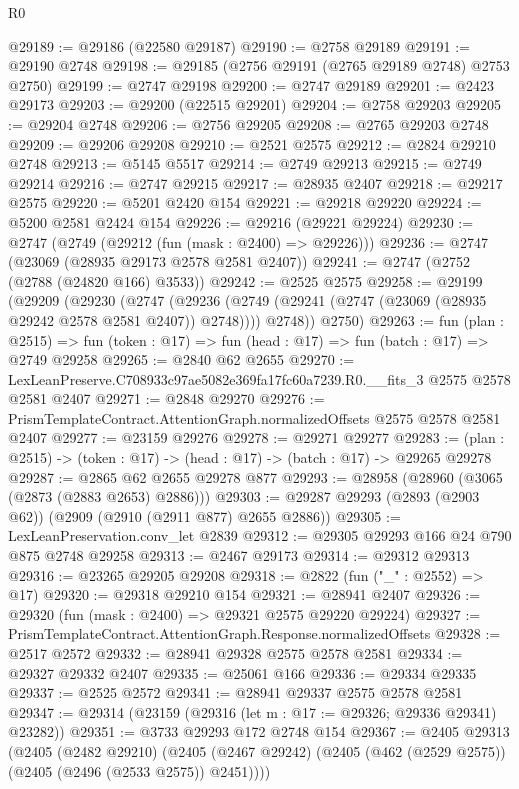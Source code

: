 \begin{lexlean}{R0}
\begin{coremodule}
@29189 := @29186 (@22580 @29187)
@29190 := @2758 @29189
@29191 := @29190 @2748
@29198 := @29185 (@2756 @29191 (@2765 @29189 @2748) @2753 @2750)
@29199 := @2747 @29198
@29200 := @2747 @29189
@29201 := @2423 @29173
@29203 := @29200 (@22515 @29201)
@29204 := @2758 @29203
@29205 := @29204 @2748
@29206 := @2756 @29205
@29208 := @2765 @29203 @2748
@29209 := @29206 @29208
@29210 := @2521 @2575
@29212 := @2824 @29210 @2748
@29213 := @5145 @5517
@29214 := @2749 @29213
@29215 := @2749 @29214
@29216 := @2747 @29215
@29217 := @28935 @2407
@29218 := @29217 @2575
@29220 := @5201 @2420 @154
@29221 := @29218 @29220
@29224 := @5200 @2581 @2424 @154
@29226 := @29216 (@29221 @29224)
@29230 := @2747 (@2749 (@29212 (fun (mask : @2400) => @29226)))
@29236 := @2747 (@23069 (@28935 @29173 @2578 @2581 @2407))
@29241 := @2747 (@2752 (@2788 (@24820 @166) @3533))
@29242 := @2525 @2575
@29258 := @29199
    (@29209
      (@29230
        (@2747
          (@29236 (@2749 (@29241 (@2747 (@23069 (@28935 @29242 @2578 @2581 @2407)) @2748))))
          @2748))
      @2750)
@29263 := fun (plan : @2515) =>
  fun (token : @17) => fun (head : @17) => fun (batch : @17) => @2749 @29258
@29265 := @2840 @62 @2655
@29270 := LexLeanPreserve.C708933c97ae5082e369fa17fc60a7239.R0.__fits_3 @2575 @2578 @2581 @2407
@29271 := @2848 @29270
@29276 := PrismTemplateContract.AttentionGraph.normalizedOffsets @2575 @2578 @2581 @2407
@29277 := @23159 @29276
@29278 := @29271 @29277
@29283 := (plan : @2515) -> (token : @17) -> (head : @17) -> (batch : @17) -> @29265 @29278
@29287 := @2865 @62 @2655 @29278 @877
@29293 := @28958 (@28960 (@3065 (@2873 (@2883 @2653) @2886)))
@29303 := @29287 @29293 (@2893 (@2903 @62)) (@2909 (@2910 (@2911 @877) @2655 @2886))
@29305 := LexLeanPreservation.conv_let @2839
@29312 := @29305 @29293 @166 @24 @790 @875 @2748 @29258
@29313 := @2467 @29173
@29314 := @29312 @29313
@29316 := @23265 @29205 @29208
@29318 := @2822 (fun ("_" : @2552) => @17)
@29320 := @29318 @29210 @154
@29321 := @28941 @2407
@29326 := @29320 (fun (mask : @2400) => @29321 @2575 @29220 @29224)
@29327 := PrismTemplateContract.AttentionGraph.Response.normalizedOffsets
@29328 := @2517 @2572
@29332 := @28941 @29328 @2575 @2578 @2581
@29334 := @29327 @29332 @2407
@29335 := @25061 @166
@29336 := @29334 @29335
@29337 := @2525 @2572
@29341 := @28941 @29337 @2575 @2578 @2581
@29347 := @29314 (@23159 (@29316 (let m : @17 := @29326; @29336 @29341) @23282))
@29351 := @3733 @29293 @172 @2748 @154
@29367 := @2405
    @29313
    (@2405
      (@2482 @29210)
      (@2405 (@2467 @29242) (@2405 (@462 (@2529 @2575)) (@2405 (@2496 (@2533 @2575)) @2451))))

\end{coremodule}
\end{lexlean}
